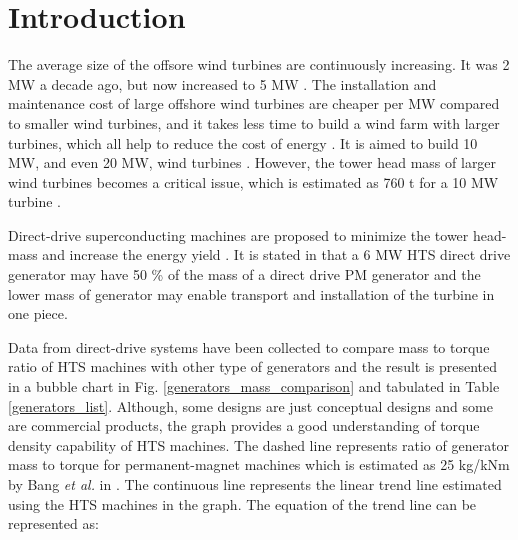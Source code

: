 \documentclass[12pt]{iopart}
\begin{document}
\maketitle

\section{Introduction}

The average size of the offsore wind turbines are continuously increasing. It was 2 MW a decade ago, but now increased to 5 MW \cite{bvg}. The installation and maintenance cost of large offshore wind turbines are cheaper per MW compared to smaller wind turbines, and it takes less time to build a wind farm with larger turbines, which all help to reduce the cost of energy \cite{Bang2008}. It is aimed to build 10 MW, and even 20 MW, wind turbines \cite{upwind}. However, the tower head mass of larger wind turbines becomes a critical issue, which is estimated as 760 t for a 10 MW turbine \cite{upwind}.

Direct-drive superconducting machines are proposed to minimize the tower head-mass and increase the energy yield \cite{Lesser2009, Lewis2007, Kalsi2004}. It is stated in \cite{Lewis2007} that a 6 MW HTS direct drive generator may have 50 \% of the mass of a direct drive PM generator and the lower mass of generator may enable transport and installation of the turbine in one piece.

Data from direct-drive systems have been collected to compare mass to torque ratio of HTS machines with other type of generators and the result is presented in a bubble chart in Fig. \ref{generators_mass_comparison} and tabulated in Table \ref{generators_list}. Although, some designs are just conceptual designs and some are commercial products, the graph provides a good understanding of torque density capability of HTS machines.  The dashed line represents ratio of generator mass to torque for permanent-magnet machines which is estimated as 25 kg/kNm by Bang \textit{et al.} in \cite{Bang2008}. The continuous line represents the linear trend line estimated using the HTS machines in the graph. The equation of the trend line can be represented as:
\end{document}
